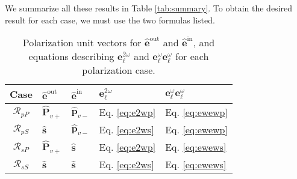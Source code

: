 \documentclass{article}
\begin{document}
We summarize all these results in Table \ref{tab:summary}. To obtain the desired
result for each case, we must use the two formulas listed.

\begin{table}[h]
\centering
\begin{tabular}{ | c l l l l | }
\hline
Case               & $\hat{\mathbf{e}}^{\mathrm{out}}$
                   & $\hat{\mathbf{e}}^{\mathrm{in}}$
                   & $\mathbf{e}^{2\omega}_{\ell}$
                   & $\mathbf{e}^{\omega}_{\ell}\mathbf{e}^{\omega}_{\ell}$ \\
\hline
$\mathcal{R}_{pP}$ & $\hat{\mathbf{P}}_{v+}$
                   & $\hat{\mathbf{p}}_{v-}$
                   &  Eq. \eqref{eq:e2wp} & Eq. \eqref{eq:ewewp} \\
$\mathcal{R}_{pS}$ & $\hat{\mathbf{s}}$
                   & $\hat{\mathbf{p}}_{v-}$
                   &  Eq. \eqref{eq:e2ws} & Eq. \eqref{eq:ewewp} \\
$\mathcal{R}_{sP}$ & $\hat{\mathbf{P}}_{v+}$
                   & $\hat{\mathbf{s}}$
                   &  Eq. \eqref{eq:e2wp} & Eq. \eqref{eq:ewews} \\
$\mathcal{R}_{sS}$ & $\hat{\mathbf{s}}$
                   & $\hat{\mathbf{s}}$
                   &  Eq. \eqref{eq:e2ws} & Eq. \eqref{eq:ewews} \\
\hline
\end{tabular}
\caption{Polarization unit vectors for $\hat{\mathbf{e}}^{\mathrm{out}}$ and
$\hat{\mathbf{e}}^{\mathrm{in}}$, and equations describing
$\mathbf{e}^{2\omega}_{\ell}$ and
$\mathbf{e}^{\omega}_{\ell}\mathbf{e}^{\omega}_{\ell}$ for each polarization
case.\label{tab:review}}
\end{table}

\end{document}
